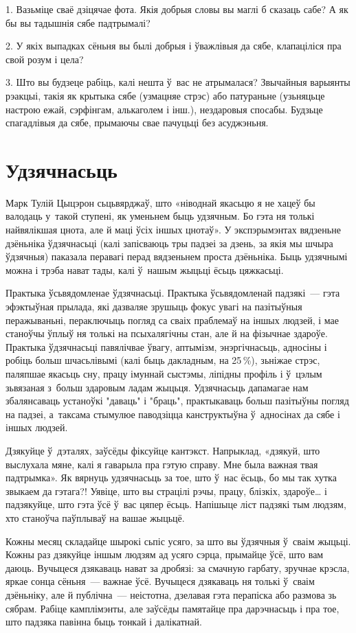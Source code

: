 1. Вазьміце сваё дзіцячае фота. Якія добрыя словы вы маглі б сказаць сабе? А як бы вы тадышнія сябе падтрымалі?

2. У якіх выпадках сёньня вы былі добрыя і ўважлівыя да сябе, клапаціліся пра свой розум і цела?

3. Што вы будзеце рабіць, калі нешта ў~вас не атрымалася? Звычайныя варыянты рэакцыі, такія як крытыка сябе (узмацняе стрэс) або патураньне (узьняцьце настрою ежай, сэрфінгам, алькаголем і інш.), нездаровыя спосабы. Будзьце спагадлівыя да сябе, прымаючы свае пачуцьці без асуджэньня.


\section{Удзячнасьць}

Марк Тулій Цыцэрон сьцьвярджаў, што «ніводнай якасьцю я не хацеў бы валодаць у~такой ступені, як уменьнем быць удзячным. Бо гэта ня толькі найвялікшая цнота, але й маці ўсіх іншых цнотаў». У экспэрымэнтах вядзеньне дзёньніка ўдзячнасьці (калі запісваюць тры падзеі за дзень, за якія мы шчыра ўдзячныя) паказала перавагі перад вядзеньнем проста дзёньніка. Быць удзячнымі можна і трэба нават тады, калі ў~нашым жыцьці ёсьць цяжкасьці.

Практыка ўсьвядомленае ўдзячнасьці. Практыка ўсьвядомленай падзякі~--- гэта эфэктыўная прылада, які дазваляе зрушыць фокус увагі на пазітыўныя перажываньні, пераключыць погляд са сваіх праблемаў на іншых людзей, і мае станоўчы ўплыў ня толькі на псыхалягічны стан, але й на фізычнае здароўе. Практыка ўдзячнасьці павялічвае ўвагу, аптымізм, энэргічнасьць, адносіны і робіць больш шчасьлівымі (калі быць дакладным, на 25\,\%), зьніжае стрэс, паляпшае якасьць сну, працу імуннай сыстэмы, ліпідны профіль і ў~цэлым зьвязаная з~больш здаровым ладам жыцьця. Удзячнасьць дапамагае нам збалянсаваць устаноўкі "даваць" і "браць", практыкаваць больш пазітыўны погляд на падзеі, а~таксама стымулюе паводзіцца канструктыўна ў~адносінах да сябе і іншых людзей.

Дзякуйце ў~дэталях, заўсёды фіксуйце кантэкст. Напрыклад, «дзякуй, што выслухала мяне, калі я гаварыла пра гэтую справу. Мне была важная твая падтрымка». Як вярнуць удзячнасьць за тое, што ў~нас ёсьць, бо мы так хутка звыкаем да гэтага?! Уявіце, што вы страцілі рэчы, працу, блізкіх, здароўе… і падзякуйце, што гэта ўсё ў~вас цяпер ёсьць. Напішыце ліст падзякі тым людзям, хто станоўча паўплываў на вашае жыцьцё.

Кожны месяц складайце шырокі сьпіс усяго, за што вы ўдзячныя ў~сваім жыцьці. Кожны раз дзякуйце іншым людзям ад усяго сэрца, прымайце ўсё, што вам даюць. Вучыцеся дзякаваць нават за дробязі: за смачную гарбату, зручнае крэсла, яркае сонца сёньня~--- важнае ўсё. Вучыцеся дзякаваць ня толькі ў~сваім дзёньніку, але й публічна~--- неістотна, дзелавая гэта перапіска або размова зь сябрам. Рабіце камплімэнты, але заўсёды памятайце пра дарэчнасьць і пра тое, што падзяка павінна быць тонкай і далікатнай.

